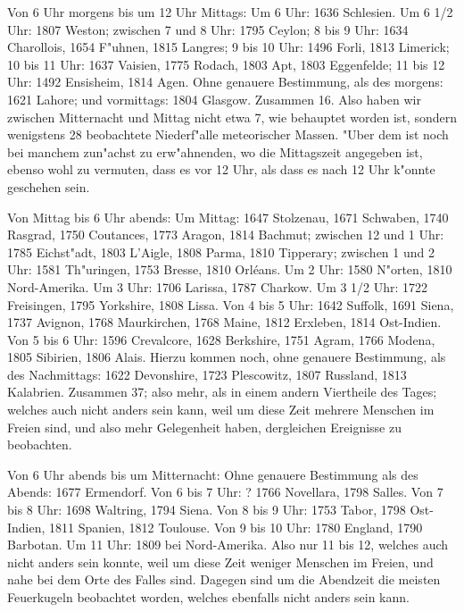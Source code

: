 \documentclass[a4paper, 11pt, oneside, polutonikogreek, german]{article}
\begin{document}
Von 6 Uhr morgens bis um 12 Uhr Mittags: Um 6 Uhr: 1636 Schlesien. Um 6 1/2 Uhr: 1807 Weston; zwischen 7 und 8 Uhr: 1795 Ceylon; 8 bis 9 Uhr: 1634 Charollois, 1654 F"uhnen, 1815 Langres; 9 bis 10 Uhr: 1496 Forli, 1813 Limerick; 10 bis 11 Uhr: 1637 Vaisien, 1775 Rodach, 1803 Apt, 1803 Eggenfelde; 11 bis 12 Uhr: 1492 Ensisheim, 1814 Agen. Ohne genauere Bestimmung, als des morgens: 1621 Lahore; und vormittags: 1804 Glasgow. Zusammen 16. Also haben wir zwischen Mitternacht und Mittag nicht etwa 7, wie behauptet worden ist, sondern wenigstens 28 beobachtete Niederf"alle meteorischer Massen. "Uber dem ist noch bei manchem zun"achst zu erw"ahnenden, wo die Mittagszeit angegeben ist, ebenso wohl zu vermuten, dass es vor 12 Uhr, als dass es nach 12 Uhr k"onnte geschehen sein.

Von Mittag bis 6 Uhr abends: Um Mittag: 1647 Stolzenau, 1671 Schwaben, 1740 Rasgrad, 1750 Coutances, 1773 Aragon, 1814 Bachmut; zwischen 12 und 1 Uhr: 1785 Eichst"adt, 1803 L'Aigle, 1808 Parma, 1810 Tipperary; zwischen 1 und 2 Uhr: 1581 Th"uringen, 1753 Bresse, 1810 Orléans. Um 2 Uhr: 1580 N"orten, 1810 Nord-Amerika. Um 3 Uhr: 1706 Larissa, 1787 Charkow. Um 3 1/2 Uhr: 1722 Freisingen, 1795 Yorkshire, 1808 Lissa. Von 4 bis 5 Uhr: 1642 Suffolk, 1691 Siena, 1737 Avignon, 1768 Maurkirchen, 1768 Maine, 1812 Erxleben, 1814 Ost-Indien. Von 5 bis 6 Uhr: 1596 Crevalcore, 1628 Berkshire, 1751 Agram, 1766 Modena, 1805 Sibirien, 1806 Alais. Hierzu kommen noch, ohne genauere Bestimmung, als des Nachmittags: 1622 Devonshire, 1723 Plescowitz, 1807 Russland, 1813 Kalabrien. Zusammen 37; also mehr, als in einem andern Viertheile des Tages; welches auch nicht anders sein kann, weil um diese Zeit mehrere Menschen im Freien sind, und also mehr Gelegenheit haben, dergleichen Ereignisse zu beobachten.

Von 6 Uhr abends bis um Mitternacht: Ohne genauere Bestimmung als des Abends: 1677 Ermendorf. Von 6 bis 7 Uhr: ? 1766 Novellara, 1798 Salles. Von 7 bis 8 Uhr: 1698 Waltring, 1794 Siena. Von 8 bis 9 Uhr: 1753 Tabor, 1798 Ost-Indien, 1811 Spanien, 1812 Toulouse. Von 9 bis 10 Uhr: 1780 England, 1790 Barbotan. Um 11 Uhr: 1809 bei Nord-Amerika. Also nur 11 bis 12, welches auch nicht anders sein konnte, weil um diese Zeit weniger Menschen im Freien, und nahe bei dem Orte des Falles sind. Dagegen sind um die Abendzeit die meisten Feuerkugeln beobachtet worden, welches ebenfalls nicht anders sein kann.
\end{document}
